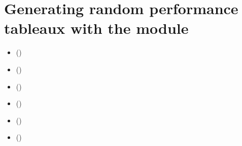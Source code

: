 \documentclass[a4paper,12pt,english]{sphinxhowto}
\begin{document}
\section{Generating random performance tableaux with the  module}
\label{\detokenize{tutorial:generating-random-performance-tableaux-with-the-randperftabs-module}}\label{\detokenize{tutorial:randomperformancetableau-tutorial-label}}
\begin{sphinxShadowBox}
\begin{itemize}
\item {} 
\label{\detokenize{tutorial:id252}}{\hyperref[\detokenize{tutorial:introduction}]{}} ()

\item {} 
\label{\detokenize{tutorial:id253}}{\hyperref[\detokenize{tutorial:random-standard-performance-tableaux}]{}} ()

\item {} 
\label{\detokenize{tutorial:id254}}{\hyperref[\detokenize{tutorial:random-cost-benefit-performance-tableaux}]{}} ()

\item {} 
\label{\detokenize{tutorial:id255}}{\hyperref[\detokenize{tutorial:random-three-objectives-performance-tableaux}]{}} ()

\item {} 
\label{\detokenize{tutorial:id256}}{\hyperref[\detokenize{tutorial:random-academic-performance-tableaux}]{}} ()

\item {} 
\label{\detokenize{tutorial:id257}}{\hyperref[\detokenize{tutorial:random-linearly-ranked-performance-tableaux}]{}} ()

\end{itemize}
\end{sphinxShadowBox}
\end{document}

